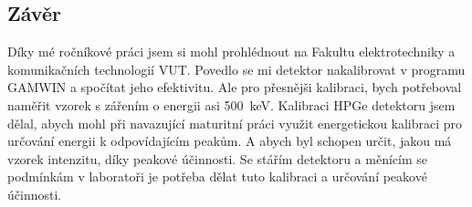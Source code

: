 \documentclass[12pt,a4paper]{article}
\begin{document}
\begin{spacing}{1.5}
\section*{Závěr}%

Díky mé ročníkové práci jsem si mohl prohlédnout na Fakultu elektrotechniky a komunikačních technologií VUT. Povedlo se mi detektor nakalibrovat v programu \mbox{GAMWIN} a spočítat jeho efektivitu. Ale pro přesnějši kalibraci, bych potřeboval naměřit vzorek s zářením o energii asi \SI{500}{\kilo\electronvolt}. Kalibraci HPGe detektoru jsem dělal, abych mohl při navazující maturitní práci využit energetickou kalibraci pro určování energii k odpovídajícím peakům. A abych byl schopen určit, jakou má vzorek intenzitu, díky peakové účinnosti. Se stářím detektoru a měnícím se podmínkám v laboratoři je potřeba dělat tuto kalibraci a určování peakové účinnosti.



\newpage
{}

\end{spacing}
\end{document}
